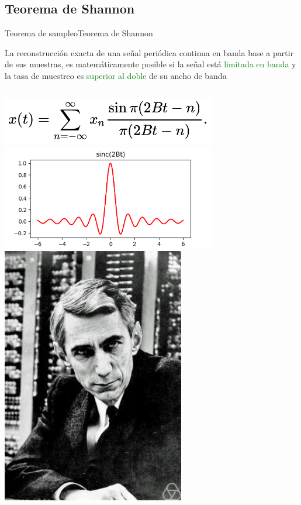  \subsection{Teorema de Shannon}
 \begin{frame}{Teorema de sampleo}{Teorema de Shannon}
    \begin{teorema}
       La reconstrucción exacta de una señal periódica continua en banda base a partir de sus muestras, es matemáticamente posible si la señal está \textcolor{green}{limitada en banda} y la tasa de muestreo es \textcolor{green}{superior al doble} de su ancho de banda
    \end{teorema}
    \begin{columns}[onlytextwidth]
       \center\includegraphics[width=0.7\textwidth]{1_clase/shannon} \\
       \center\includegraphics[width=0.7\textwidth]{1_clase/sinc_limpia}
       \center\includegraphics[width=0.6\textwidth]{1_clase/claude_shannon}
    \end{columns}
    \vfill
 \end{frame}
